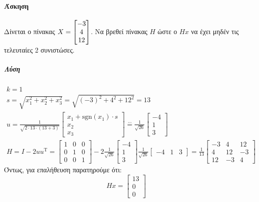\documentclass[11pt,a4paper,notitlepage,fleqn]{article}
\begin{document}
\paragraph{Άσκηση}
Δίνεται ο πίνακας \( \mathlarger{X=\left[\begin{matrix}
	-3\\4\\12 \end{matrix}
	\right]} \). Να βρεθεί πίνακας \( H \) ώστε ο \( Hx \) να έχει μηδέν
τις τελευταίες 2 συνιστώσες.
\subparagraph{Λύση}
\begin{gather*}
	k=1 \\ s=\sqrt{x_1^2+x_2^2+x_3^2} = \sqrt{(-3)^2+4^2+12^2} = 13
	\\ u = \frac{1}{\sqrt{2\cdot 13\cdot (13+3)}}\left[
	\begin{matrix}
	x_1+\mathrm{sgn}(x_1)\cdot s\\ x_2 \\ x_3
	\end{matrix}\right] \overset{\cdots}{=} \frac{1}{\sqrt{26}} \left[
	\begin{matrix}
	-4\\1\\3
	\end{matrix}\right] \\
	H = I-2uu^{\mathrm T} = \left[\begin{matrix}
	1&0&0\\0&1&0\\0&0&1
	\end{matrix}\right] - 2\frac{1}{\sqrt{26}}\left[\begin{matrix}
	-4\\1\\3
	\end{matrix}\right]\frac{1}{\sqrt{26}}\left[\begin{matrix}
	-4&1&3
	\end{matrix}\right]
	= \frac{1}{13}\left[\begin{matrix}
	-3&4&12\\4&12&-3\\12&-3&4
	\end{matrix}\right]
\end{gather*}
Όντως, για επαλήθευση παρατηρούμε ότι:
\[
Hx = \left[\begin{matrix}
13\\0\\0
\end{matrix}\right]
\]
\end{document}
